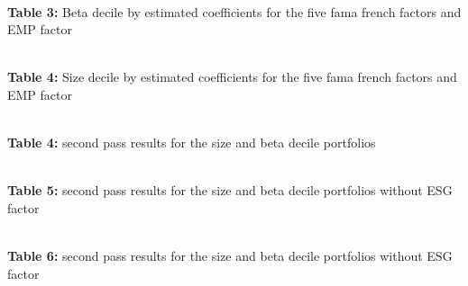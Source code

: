 \documentclass[12pt,oneside,reqno]{amsart}
\begin{document}
\begin{center}
    \paperspacingnarrow
    \\
    \textbf{Table 3:} Beta decile by estimated coefficients for the  five fama french factors and EMP factor\\
    \paperspacingwide
\end{center}


\vspace{1cm}


\begin{center}
    \paperspacingnarrow
    \\
    \textbf{Table 4:} Size decile by estimated coefficients for the  five fama french factors and EMP factor\\
    \paperspacingwide
\end{center}


\begin{center}
    \paperspacingnarrow
    \\
    \textbf{Table 4:} second pass results for the size and beta decile portfolios\\
    \paperspacingwide
\end{center}


\begin{center}
    \paperspacingnarrow
    \\
    \textbf{Table 5:} second pass results for the size and beta decile portfolios without ESG factor\\
    \paperspacingwide
\end{center}


\begin{center}
    \paperspacingnarrow
    \\
    \textbf{Table 6:} second pass results for the size and beta decile portfolios without ESG factor\\
    \paperspacingwide

\end{center}

\clearpage
\restoregeometry


%
\end{document}
